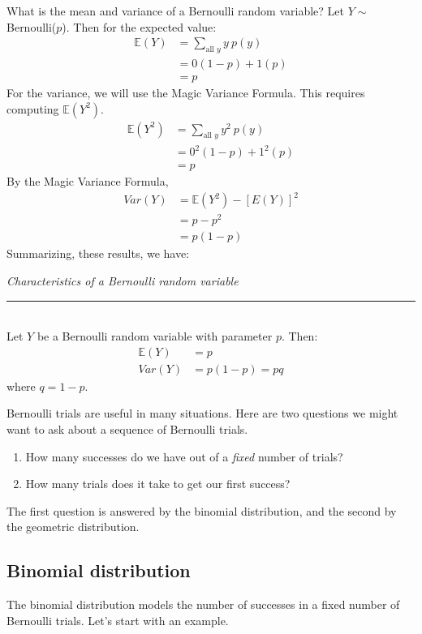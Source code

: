 \documentclass[12pt]{article}
\theoremstyle{definition}
\theoremstyle{remark}
\def\E{{\mathbb E}}
\begin{document}
What is the mean and variance of a Bernoulli random variable? Let $Y \sim$ Bernoulli($p$). Then for the expected value:
\begin{align*}
\E(Y) &= \sum_{\text{all }y}y\:p(y) \\
&= 0(1 - p) + 1(p) \\
&= p
\end{align*}
For the variance, we will use the Magic Variance Formula. This requires computing $\E(Y^2)$.
\begin{align*}
\E(Y^2) &= \sum_{\text{all }y}y^2\:p(y) \\
&= 0^2(1 - p) + 1^2(p) \\
&= p
\end{align*}
By the Magic Variance Formula,
\begin{align*}
Var(Y) &= \E(Y^2) - [E(Y)]^2 \\
&= p - p^2 \\
&= p(1-p)
\end{align*}
Summarizing, these results, we have:
\begin{framed}
  \emph{Characteristics of a Bernoulli random variable}\\
  \rule{\dimexpr{}\fboxrule}{.1pt} \\
Let $Y$ be a Bernoulli random variable with parameter $p$. Then:
\begin{align*}
\E(Y) &= p \\
Var(Y) &= p(1-p) = pq
\end{align*}
where $q = 1-p$.
\end{framed}

Bernoulli trials are useful in many situations. Here are two questions we might want to ask about a sequence of Bernoulli trials.

\begin{enumerate}
\item How many successes do we have out of a \emph{fixed} number of trials?
\item How many trials does it take to get our first success?
\end{enumerate}

The first question is answered by the binomial distribution, and the second by the geometric distribution.

\subsection{Binomial distribution}

The binomial distribution models the number of successes in a fixed number of Bernoulli trials. Let's start with an example.
\end{document}
